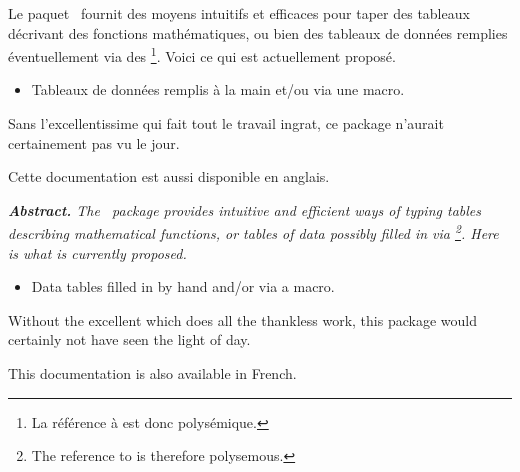\documentclass[10pt, a4paper]{article}
\begin{document}
\noindent
Le paquet \thispack\ fournit des moyens intuitifs et efficaces pour taper des tableaux décrivant des fonctions mathématiques, ou bien des tableaux de données remplies éventuellement via des 
\footnote{
	La référence à  est donc polysémique.
}.
Voici ce qui est actuellement proposé.
\begin{itemize}
	\item Tableaux de données remplis à la main et/ou via une macro.

%
%
\end{itemize}


\begin{tdocrem}
	Sans l'excellentissime  qui fait tout le travail ingrat, ce package n'aurait certainement pas vu le jour.
\end{tdocrem}


\begin{tdocnote}
	Cette documentation est aussi disponible en anglais.
\end{tdocnote}




\tdocsep

{\noindent
\small\itshape
\textbf{Abstract.}
The \thispack\ package provides intuitive and efficient ways of typing tables describing mathematical functions, or tables of data possibly filled in via 
\footnote{
	The reference to  is therefore polysemous.
}.
Here is what is currently proposed.
\begin{itemize}
	\item Data tables filled in by hand and/or via a macro.

%
%
\end{itemize}


\begin{tdocrem}
	Without the excellent  which does all the thankless work, this package would certainly not have seen the light of day.
\end{tdocrem}


\begin{tdocnote}
	This documentation is also available in French.
\end{tdocnote}
}
\end{document}
